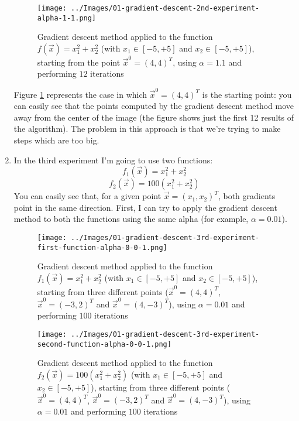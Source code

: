 \begin{enumerate}
            \begin{figure}
                \centering
                \texttt{[image: ../Images/01-gradient-descent-2nd-experiment-alpha-1-1.png]}
                \caption{Gradient descent method applied to the function \(f(\vec{x}) = x_{1}^{2} + x_{2}^{2}\) (with \(x_1 \in [-5, +5]\) and \(x_2 \in [-5, +5]\)), starting from the point \(\vec{x}^0 = (4,4)^T\), using \(\alpha = 1.1\) and performing \(12\) iterations}
                \label{gradient-descent-2nd-experiment-alpha-1-1}
            \end{figure}
            Figure \ref{gradient-descent-2nd-experiment-alpha-1-1} represents the case in which \(\vec{x}^0 = (4,4)^T\) is the starting point: you can easily see that the points computed by the gradient descent method move away from the center of the image (the figure shows just the first 12 results of the algorithm). The problem in this approach is that we're trying to make steps which are too big.
            \item In the third experiment I'm going to use two functions:
            \[f_1(\vec{x}) = x_{1}^{2} + x_{2}^{2}\]
            \[f_2(\vec{x}) = 100(x_{1}^{2} + x_{2}^{2})\]
            You can easily see that, for a given point \(\vec{x} = (x_1, x_2)^T\), both gradients point in the same direction. First, I can try to apply the gradient descent method to both the functions using the same alpha (for example, \(\alpha = 0.01\)).
            \begin{figure}
                \centering
                \texttt{[image: ../Images/01-gradient-descent-3rd-experiment-first-function-alpha-0-0-1.png]}
                \caption{Gradient descent method applied to the function \(f_1(\vec{x}) = x_{1}^{2} + x_{2}^{2}\) (with \(x_1 \in [-5, +5]\) and \(x_2 \in [-5, +5]\)), starting from three different points (\(\vec{x}^0 = (4,4)^T\), \(\vec{x}^0 = (-3,2)^T\) and \(\vec{x}^0 = (4,-3)^T\)), using \(\alpha = 0.01\) and performing \(100\) iterations}
                \label{gradient-descent-3rd-experiment-first-function-alpha-0-0-1}
            \end{figure}
            \begin{figure}
                \centering
                \texttt{[image: ../Images/01-gradient-descent-3rd-experiment-second-function-alpha-0-0-1.png]}
                \caption{Gradient descent method applied to the function \(f_2(\vec{x}) = 100(x_{1}^{2} + x_{2}^{2})\) (with \(x_1 \in [-5, +5]\) and \(x_2 \in [-5, +5]\)), starting from three different points (\(\vec{x}^0 = (4,4)^T\), \(\vec{x}^0 = (-3,2)^T\) and \(\vec{x}^0 = (4,-3)^T\)), using \(\alpha = 0.01\) and performing \(100\) iterations}

\end{figure}
\end{enumerate}
